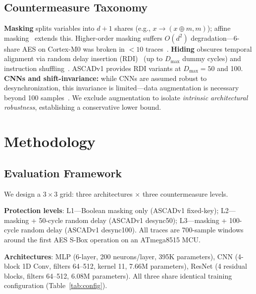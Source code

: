 \documentclass[runningheads]{llncs}
\begin{document}
\subsection{Countermeasure Taxonomy}

\textbf{Masking} splits variables into $d+1$ shares (e.g., $x \rightarrow (x \oplus m, m)$); affine masking~\cite{fumaroli2010affine} extends this. Higher-order masking suffers $O(d^2)$ degradation---6-share AES on Cortex-M0 was broken in $< 10$ traces~\cite{bronchain2021breaking}. \textbf{Hiding} obscures temporal alignment via random delay insertion (RDI)~\cite{coron2009} (up to $D_{\text{max}}$ dummy cycles) and instruction shuffling~\cite{von2006}. ASCADv1 provides RDI variants at $D_{\text{max}} = 50$ and 100. \textbf{CNNs and shift-invariance:} while CNNs are assumed robust to desynchronization, this invariance is limited---data augmentation is necessary beyond 100 samples~\cite{krcek2024shift,paguada2024systematic}. We exclude augmentation to isolate \emph{intrinsic architectural robustness}, establishing a conservative lower bound.

\section{Methodology}

\subsection{Evaluation Framework}

We design a $3 \times 3$ grid: three architectures $\times$ three countermeasure levels.

\noindent\textbf{Protection levels}: L1---Boolean masking only (ASCADv1 fixed-key); L2---masking + 50-cycle random delay (ASCADv1 desync50); L3---masking + 100-cycle random delay (ASCADv1 desync100). All traces are 700-sample windows around the first AES S-Box operation on an ATmega8515 MCU.

\noindent\textbf{Architectures}: MLP (6-layer, 200 neurons/layer, 395K parameters), CNN (4-block 1D Conv, filters 64--512, kernel 11, 7.66M parameters), ResNet (4 residual blocks, filters 64--512, 6.08M parameters). All three share identical training configuration (Table~\ref{tab:config}).
\end{document}
